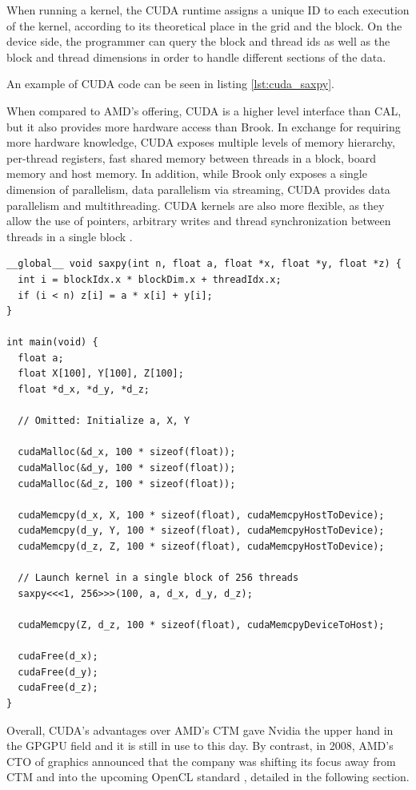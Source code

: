 When running a kernel, the CUDA runtime assigns a unique ID to each execution of the kernel, according to its theoretical place in the grid and the block. On the device side, the programmer can query the block and thread ids as well as the block and thread dimensions in order to handle different sections of the data. 

An example of CUDA code can be seen in listing \ref{lst:cuda_saxpy}.

When compared to AMD's offering, CUDA is a higher level interface than CAL, but it also provides more hardware access than Brook. In exchange for requiring more hardware knowledge, CUDA exposes multiple levels of memory hierarchy, per-thread registers, fast shared memory between threads in a block, board memory and host memory. In addition, while Brook only exposes a single dimension of parallelism, data parallelism via streaming, CUDA provides data parallelism and multithreading. CUDA kernels are also more flexible, as they allow the use of pointers, arbitrary writes and thread synchronization between threads in a single block \cite{gpu_computing}.

\begin{lstlisting}[style=CStyle, caption=CUDA saxpy example, float, label={lst:cuda_saxpy}]
__global__ void saxpy(int n, float a, float *x, float *y, float *z) {
  int i = blockIdx.x * blockDim.x + threadIdx.x;
  if (i < n) z[i] = a * x[i] + y[i];
}

int main(void) {
  float a;
  float X[100], Y[100], Z[100];
  float *d_x, *d_y, *d_z;

  // Omitted: Initialize a, X, Y

  cudaMalloc(&d_x, 100 * sizeof(float)); 
  cudaMalloc(&d_y, 100 * sizeof(float));
  cudaMalloc(&d_z, 100 * sizeof(float));

  cudaMemcpy(d_x, X, 100 * sizeof(float), cudaMemcpyHostToDevice);
  cudaMemcpy(d_y, Y, 100 * sizeof(float), cudaMemcpyHostToDevice);
  cudaMemcpy(d_z, Z, 100 * sizeof(float), cudaMemcpyHostToDevice);

  // Launch kernel in a single block of 256 threads
  saxpy<<<1, 256>>>(100, a, d_x, d_y, d_z);

  cudaMemcpy(Z, d_z, 100 * sizeof(float), cudaMemcpyDeviceToHost);

  cudaFree(d_x);
  cudaFree(d_y);
  cudaFree(d_z);
}
\end{lstlisting}

Overall, CUDA's advantages over AMD's CTM gave Nvidia the upper hand in the GPGPU field and it is still in use to this day. By contrast, in 2008, AMD's CTO of graphics announced that the company was shifting its focus away from CTM and into the upcoming OpenCL standard \cite{amd_ctm_ditch}, detailed in the following section.

